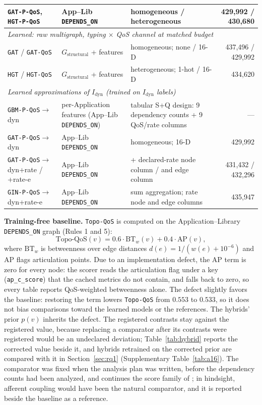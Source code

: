 \documentclass[preprint,3p]{elsarticle}
\begin{document}
\begin{table}[htbp]
{\begin{tabular}{lllr}
\texttt{GAT-P-QoS}, \texttt{HGT-P-QoS} & App--Lib \texttt{DEPENDS\_ON} & homogeneous / heterogeneous & 429{,}992 / 430{,}680 \\
\midrule
\multicolumn{4}{l}{\textit{Learned: raw multigraph, typing $\times$ QoS channel at matched budget}} \\
\texttt{GAT} / \texttt{GAT-QoS} & $G_{\text{structural}}$ + features & homogeneous; none / 16-D & 437{,}496 / 429{,}992 \\
\texttt{HGT} / \texttt{HGT-QoS} & $G_{\text{structural}}$ + features & heterogeneous; 1-hot / 16-D & 434{,}620 \\
\midrule
\multicolumn{4}{l}{\textit{Learned approximations of $I_{\text{dyn}}$ (trained on $I_{\text{dyn}}$ labels)}} \\
\texttt{GBM-P-QoS}$\to$dyn & per-Application features (App--Lib \texttt{DEPENDS\_ON}) & tabular S+Q design: 9 dependency counts + 9 QoS/rate columns & --- \\
\texttt{GAT-P-QoS}$\to$dyn & App--Lib \texttt{DEPENDS\_ON} & homogeneous; 16-D & 429{,}992 \\
\texttt{GAT-P-QoS}$\to$dyn+rate / +rate-e & App--Lib \texttt{DEPENDS\_ON} & + declared-rate node column / and edge column & 431{,}432 / 432{,}296 \\
\texttt{GIN-P-QoS}$\to$dyn+rate-e & App--Lib \texttt{DEPENDS\_ON} & sum aggregation; rate node and edge columns & 435{,}947 \\
\bottomrule
\end{tabular}%
}
\end{table}

\noindent\textbf{Training-free baseline.} \texttt{Topo-QoS} is computed on the Application--Library \texttt{DEPENDS\_ON} graph (Rules 1 and 5):
\begin{equation}
\label{eq:topo}
\text{Topo-QoS}(v) = 0.6 \cdot \text{BT}_{w}(v) + 0.4 \cdot \text{AP}(v),
\end{equation}
where $\text{BT}_{w}$ is betweenness over edge distances $d(e) = 1/(w(e) + 10^{-6})$ and AP flags articulation points. Due to an implementation defect, the AP term is zero for every node: the scorer reads the articulation flag under a key (\texttt{ap\_c\_score}) that the cached metrics do not contain, and falls back to zero, so every table reports QoS-weighted betweenness alone. The defect slightly favors the baseline: restoring the term lowers \texttt{Topo-QoS} from $0.553$ to $0.533$, so it does not bias comparisons toward the learned models or the references. The hybrids' prior $p(v)$ inherits the defect. The registered contrasts stay against the registered value, because replacing a comparator after its contrasts were registered would be an undeclared deviation; Table~\ref{tab:hybrid} reports the corrected value beside it, and hybrids retrained on the corrected prior are compared with it in Section~\ref{sec:rq1} (Supplementary Table~\ref{tab:a16}). The comparator was fixed when the analysis plan was written, before the dependency counts had been analyzed, and continues the score family of \cite{yigit2025graph}; in hindsight, afferent coupling would have been the natural comparator, and it is reported beside the baseline as a reference.
\end{document}

